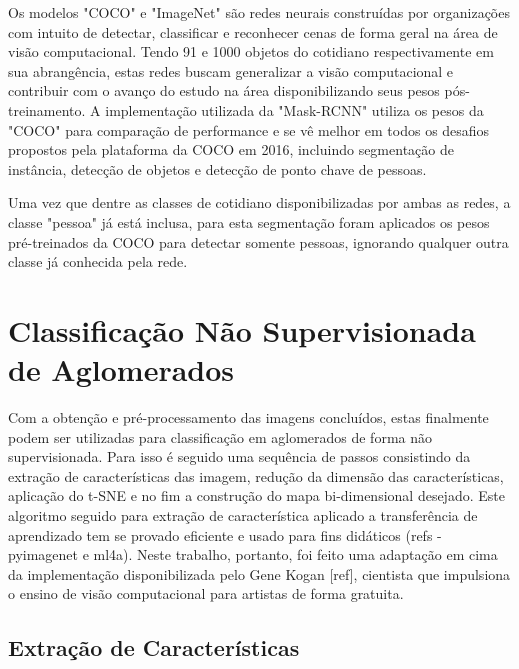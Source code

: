 \documentclass[12pt]{report}
\begin{document}
Os modelos "COCO" e "ImageNet" são redes neurais construídas por organizações com intuito de detectar, classificar e reconhecer cenas de forma geral na área de visão computacional. Tendo 91 e 1000 objetos do cotidiano respectivamente em sua abrangência, estas redes buscam generalizar a visão computacional e contribuir com o avanço do estudo na área disponibilizando seus pesos pós-treinamento. A implementação utilizada da "Mask-RCNN" utiliza os pesos da "COCO" para comparação de performance e se vê melhor em todos os desafios propostos pela plataforma da COCO em 2016, incluindo segmentação de instância, detecção de objetos e detecção de ponto chave de pessoas. 

Uma vez que dentre as classes de cotidiano disponibilizadas por ambas as redes, a classe "pessoa" já está inclusa, para esta segmentação foram aplicados os pesos pré-treinados da COCO para detectar somente pessoas, ignorando qualquer outra classe já conhecida pela rede. 

\section{Classificação Não Supervisionada de Aglomerados}


Com a obtenção e pré-processamento das imagens concluídos, estas finalmente podem ser utilizadas para classificação em aglomerados de forma não supervisionada. Para isso é seguido uma sequência de passos consistindo da extração de características das imagem, redução da dimensão das características, aplicação do t-SNE e no fim a construção do mapa bi-dimensional desejado. Este algoritmo seguido para extração de característica aplicado a transferência de aprendizado tem se provado eficiente e usado para fins didáticos (refs - pyimagenet e ml4a). Neste trabalho, portanto, foi feito uma adaptação em cima da implementação disponibilizada pelo Gene Kogan [ref], cientista que impulsiona o ensino de visão computacional para artistas de forma gratuita.


\subsection{Extração de Características}
\end{document}
